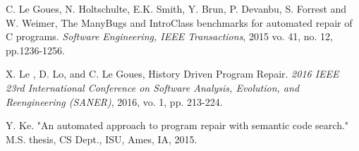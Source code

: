 \documentclass{paper}
\begin{document}
\begin{thebibliography}{99}
  C. Le Goues, N. Holtschulte, E.K. Smith, Y. Brun, P. Devanbu, S.  Forrest and W. Weimer, The ManyBugs and IntroClass benchmarks for automated repair of C programs. \textit{Software Engineering, IEEE Transactions}, 2015 vo. 41, no. 12, pp.1236-1256.

 X. Le , D. Lo, and C. Le Goues, History Driven Program Repair. \textit{2016 IEEE 23rd International Conference on Software Analysis, Evolution, and Reengineering (SANER)}, 2016, vo. 1, pp. 213-224.  

 Y. Ke. "An automated approach to program repair with semantic code search." M.S. thesis, CS Dept., ISU, Ames, IA, 2015.


\end{thebibliography}
\end{document}
